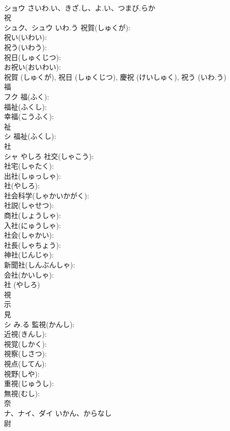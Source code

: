 \documentclass[8pt]{extreport}
\begin{document}
\begin{CJK}{UTF8}{min}
\\	ショウ	さいわ.い、きざ.し、よ.い、つまび.らか		
\\	祝			
\\	シュク、シュウ	いわ.う	祝賀(しゅくが): 
\\	祝い(いわい): 
\\	祝う(いわう): 
\\	祝日(しゅくじつ): 
\\	お祝い(おいわい): 
\\	祝賀 (しゅくが), 祝日 (しゅくじつ), 慶祝 (けいしゅく), 祝う (いわ.う)
\\	福			
\\	フク		福(ふく): 
\\	福祉(ふくし): 
\\	幸福(こうふく): 
\\	祉			
\\	シ		福祉(ふくし): 
\\	社			
\\	シャ	やしろ	社交(しゃこう): 
\\	社宅(しゃたく): 
\\	出社(しゅっしゃ): 
\\	社(やしろ): 
\\	社会科学(しゃかいかがく): 
\\	社説(しゃせつ): 
\\	商社(しょうしゃ): 
\\	入社(にゅうしゃ): 
\\	社会(しゃかい): 
\\	社長(しゃちょう): 
\\	神社(じんじゃ): 
\\	新聞社(しんぶんしゃ): 
\\	会社(かいしゃ): 
\\	社 (やしろ)
\\	視			
\\	示 
\\	見 
\\	シ	み.る	監視(かんし): 
\\	近視(きんし): 
\\	視覚(しかく): 
\\	視察(しさつ): 
\\	視点(してん): 
\\	視野(しや): 
\\	重視(じゅうし): 
\\	無視(むし): 
\\	奈			
\\	ナ、ナイ、ダイ	いかん、からなし		
\\	尉			

\end{CJK}
\end{document}
